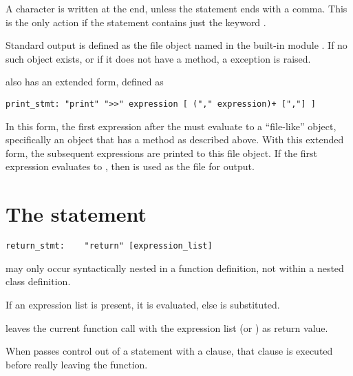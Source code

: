 A  character is written at the end, unless the
 statement ends with a comma.  This is the only action
if the statement contains just the keyword .

Standard output is defined as the file object named 
in the built-in module .  If no such object exists, or if
it does not have a  method, a 
exception is raised.

 also has an extended form, defined as

\begin{verbatim}
print_stmt: "print" ">>" expression [ ("," expression)+ [","] ]
\end{verbatim}

In this form, the first expression after the \keyword{>>} must
evaluate to a ``file-like'' object, specifically an object that has a
 method as described above.  With this extended form,
the subsequent expressions are printed to this file object.  If the
first expression evaluates to , then  is
used as the file for output.

\section{The  statement \label{return}}

\begin{verbatim}
return_stmt:    "return" [expression_list]
\end{verbatim}

 may only occur syntactically nested in a function
definition, not within a nested class definition.

If an expression list is present, it is evaluated, else 
is substituted.

 leaves the current function call with the expression
list (or ) as return value.

When  passes control out of a  statement
with a  clause, that  clause is executed
before really leaving the function.

